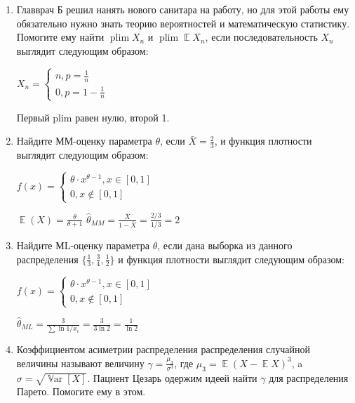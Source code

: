 \documentclass[12pt]{article}
\DeclareMathOperator{\plim}{plim}
\DeclareMathOperator{\E}{\mathbb{E}}
\DeclareMathOperator{\Var}{\mathbb{V}ar}
\newenvironment{solution}{}{}
\begin{document}
\begin{enumerate}
    \item Главврач Б решил нанять нового санитара на работу, но для этой работы ему обязательно нужно знать теорию вероятностей и математическую статистику. Помогите ему найти $\plim{X_n}$ и $\plim{\E{X_n}}$, если последовательность $X_n$ выглядит следующим образом:
    
    $X_n = 
    \begin{cases}
    n, p = \frac{1}{n} \\
    0, p = 1 - \frac{1}{n}
    \end{cases}$
    
\begin{solution}
        Первый plim равен нулю, второй 1.
\end{solution}
    
    \item Найдите ММ-оценку параметра $\theta$, если $\bar{X} = \frac{2}{3}$, и функция плотности выглядит следующим образом:
    
    $f(x) = 
    \begin{cases}

    \theta \cdot x^{\theta - 1}, x \in [0, 1] \\
    0, x \notin [0, 1]
    \end{cases}$
    
\begin{solution}
    
        $\E(X) = \frac{\theta}{\theta + 1}$
        $\hat{\theta}_{MM} = \frac{\bar{X}}{1 - \bar{X}} = \frac{2/3}{1/3} = 2$
        
\end{solution}
    
    \item Найдите МL-оценку параметра $\theta$, если дана выборка из данного распределения $\{\frac{1}{3}, \frac{3}{4}, \frac{1}{2}\}$ и функция плотности выглядит следующим образом:
    
    $f(x) = 
    \begin{cases}
    \theta \cdot x^{\theta - 1}, x \in [0, 1] \\
    0, x \notin [0, 1]
    \end{cases}$
    
\begin{solution}
        $\hat{\theta}_{ML} = \frac{3}{\sum \ln{1 / x_i}} = \frac{3}{3\ln{2}} = \frac{1}{\ln{2}}$
\end{solution}
    
    \item Коэффициентом асиметрии распределения распределения случайной величины называют величину $\gamma=\frac{\mu_3}{\sigma^3}$, где $\mu_3=\E(X-\E X)^3$, a $\sigma=\sqrt{\Var[X]}$. Пациент Цезарь одержим идеей найти $\gamma$ для распределения Парето. Помогите ему в этом.
    

\end{enumerate}
\end{document}
